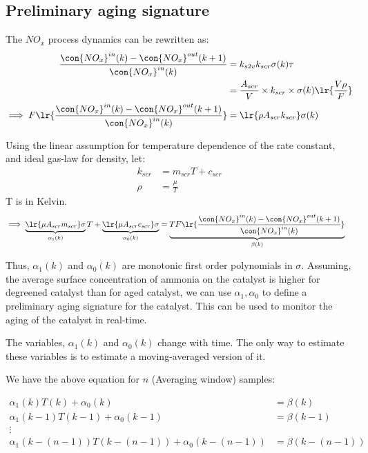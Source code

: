 \subsection{Preliminary aging signature}
The $NO_x$ process dynamics can be rewritten as:
\begin{align*}
    \frac{\con{NO_x}^{in}(k) - \con{NO_x}^{out}(k + 1)}{\con{NO_x}^{in}(k)} &=
    k_{s2v} k_{scr} \sigma(k) \tau\\
    &= \frac{A_{scr}}{V} \times k_{scr} \times \sigma(k) \lr{\frac{V \rho}{F}}\\
    \implies F \lr{\frac{\con{NO_x}^{in}(k) - \con{NO_x}^{out}(k + 1)}{\con{NO_x}^{in}(k)}} &= \lr{\rho A_{scr} k_{scr}} \sigma(k) \\
\end{align*}

Using the linear assumption for temperature dependence of the rate constant, and
ideal gas-law for density, let:
\begin{align*}
    k_{scr} &= m_{scr} T + c_{scr}\\
    \rho &= \frac{\mu}{T}
\end{align*}
T is in Kelvin.
\begin{align*}
    \implies \underbrace{\lr{\mu A_{scr} m_{scr}}\sigma}_{\alpha_1(k)}  T+ \underbrace{\lr{\mu A_{scr} c_{scr}} \sigma}_{\alpha_0(k)} &= \underbrace{T F \lr{\frac{\con{NO_x}^{in}(k) - \con{NO_x}^{out}(k + 1)}{\con{NO_x}^{in}(k)}}}_{\beta(k)}
\end{align*}

Thus, $\alpha_1(k)$ and $\alpha_0(k)$ are monotonic first order
polynomials in $\sigma$. Assuming, the average surface concentration of ammonia
on the catalyst is higher for degreened catalyst than for aged catalyst, we can
use $\alpha_1, \alpha_0$ to define a preliminary aging signature for the
catalyst. This can be used to monitor the aging of the catalyst in real-time.


The variables, $\alpha_1(k)$ and $\alpha_0(k)$ change with time. The only way to
estimate these variables is to estimate a moving-averaged version of it.


We have the above equation for $n$ (Averaging window) samples:

\begin{align*}
    \alpha_1(k) T(k) + \alpha_0(k) &= \beta(k)\\
    \alpha_1(k-1)T(k-1) + \alpha_0(k-1) &= \beta(k-1)\\
    \vdots &\\
    \alpha_1(k-(n-1))T(k-(n-1)) + \alpha_0(k-(n-1)) &= \beta(k-(n-1))\\
\end{align*}

